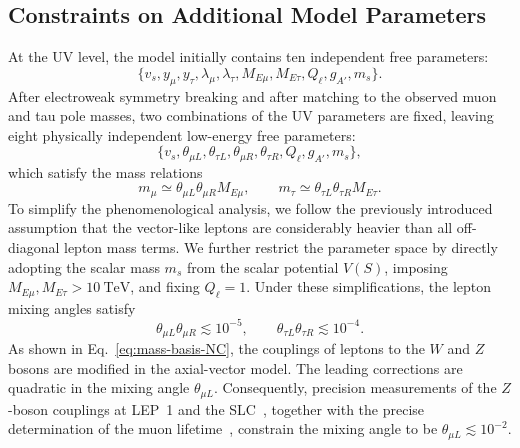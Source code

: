 \documentclass[onecolumn, aps, nofootinbib, prd, preprint, floats, floatfix, amsmath, amssymb, superscriptaddress, preprintnumbers]{revtex4-1}
\newcommand{\zb}[1]{{\color{blue} {#1}}}
\begin{document}
\subsection{Constraints on Additional Model Parameters}

At the UV level, the model initially contains ten independent free parameters:
\begin{equation}
    \{v_s, y_\mu, y_\tau, \lambda_\mu,\lambda_\tau, M_{E\mu}, M_{E\tau}, Q_\ell, g_{A'}, m_s \}.
    \end{equation}
After electroweak symmetry breaking and after matching to the observed muon and tau pole masses, two combinations of the UV parameters are fixed, leaving eight physically independent low-energy free parameters:
\begin{equation}
    \{v_s, \theta_{\mu L}, \theta_{\tau L}, \theta_{\mu R},\theta_{\tau R}, Q_\ell, g_{A'}, m_s \},
    \end{equation}
which satisfy the mass relations
\begin{equation}
    m_\mu\simeq \theta_{\mu L} \theta_{\mu R} M_{E\mu}, \qquad
    m_\tau\simeq \theta_{\tau L} \theta_{\tau R} M_{E\tau}.
    \end{equation}
To simplify the phenomenological analysis, we follow the previously introduced assumption that the vector-like leptons are considerably heavier than all off-diagonal lepton mass terms. We further restrict the parameter space by directly adopting the scalar mass $m_s$ from the scalar potential $V(S)$, imposing $M_{E\mu},M_{E\tau} > 10~\mathrm{TeV}$, and fixing $Q_\ell=1$. Under these simplifications, the lepton mixing angles satisfy
\begin{equation}
    \theta_{\mu L}\theta_{\mu R}\lesssim 10^{-5}, \qquad
    \theta_{\tau L}\theta_{\tau R}\lesssim 10^{-4}.
    \end{equation}
\zb{As shown in Eq.~\eqref{eq:mass-basis-NC}, the couplings of leptons to the $W$ and $Z$ bosons are modified in the axial-vector model. The leading corrections are quadratic in the mixing angle $\theta_{\mu L}$. Consequently, precision measurements of the $Z$-boson couplings at LEP~1 and the SLC~\cite{ALEPH:2005ab}, together with the precise determination of the muon lifetime~\cite{ParticleDataGroup:2024cfk}, constrain the mixing angle to be $\theta_{\mu L} \lesssim 10^{-2}$.}
\end{document}

